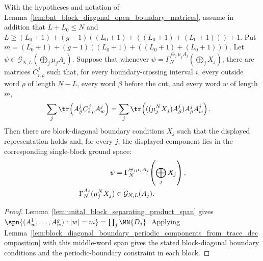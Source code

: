 \begin{lemma}
    \label{lem:block_diagonal_boundary_periodic_components_from_trace_decomposition_bnt_span}
    \leanok
    With the hypotheses and notation of
    Lemma~\ref{lem:bnt_block_diagonal_open_boundary_matrices}, assume in
    addition that $L+L_0\le N$ and
    $L \ge (L_0+1) +(g-1)((L_0+1)+((L_0+1)+(L_0+1)))+1$.
    Put
    $m = (L_0+1) +(g-1)((L_0+1)+((L_0+1)+(L_0+1)))$.
    Let $\psi\in\mathcal G_{N,L}(\bigoplus_j\mu_jA_j)$. Suppose that whenever
    $\psi=\Gamma_N^{\oplus_j\mu_jA_j}(\bigoplus_jX_j)$, there are matrices
    $C^j_{i,\rho}$ such that, for every boundary-crossing interval $i$, every
    outside word $\rho$ of length $N-L$, every word $\beta$ before the cut,
    and every word $w$ of length $m$,
    \begin{align}
        \sum_j\tr\!\left(A^j_\beta C^j_{i,\rho}A^j_w\right)
         & =
        \sum_j\tr\!\left(((\mu_j^NX_j)A^j_\beta)A^j_\rho A^j_w\right).
        \notag
    \end{align}
    Then there are block-diagonal boundary conditions $X_j$ such that the displayed
    representation holds and, for every $j$, the displayed component lies in
    the corresponding single-block ground space:
    \begin{align}
        \psi
         & =
        \Gamma_N^{\oplus_j\mu_jA_j}\!\left(\bigoplus_jX_j\right),
        \notag                       \\
        \Gamma_N^{A_j}(\mu_j^NX_j)
         & \in\mathcal G_{N,L}(A_j).
        \notag
    \end{align}
\end{lemma}

\begin{proof}
    \leanok
    Lemma~\ref{lem:unital_block_separating_product_span} gives
    $\spn\{(A^1_w,\ldots,A^g_w):|w|=m\} = \prod_j\MN{D_j}$.
    Applying
    Lemma~\ref{lem:block_diagonal_boundary_periodic_components_from_trace_decomposition}
    with this middle-word span gives the stated block-diagonal boundary
    conditions and the periodic-boundary constraint in each block.
\end{proof}

